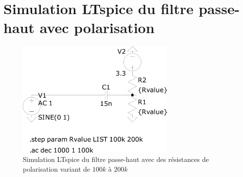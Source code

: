\section{Simulation LTspice du filtre passe-haut avec polarisation} \label{ltspiceHighPassResistors}
\begin{figure}[H]
    \centering
    \includegraphics[width=0.7\textwidth]{pdffiles/HighPass/CircuitHighPassPolarization.pdf}
    \caption{Simulation LTspice du filtre passe-haut avec des résistances de polarisation variant de $100k$ à $200k$}
    \label{fig:ltspiceHighPassResistors}
\end{figure}




\newpage

